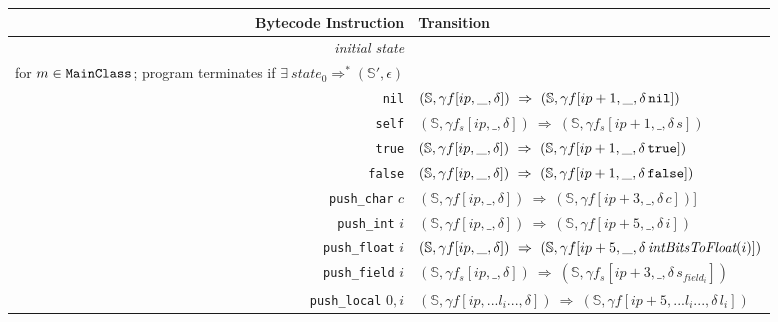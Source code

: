 \documentclass[11pt]{article}
\begin{document}
\begin{figure}
\begin{center}
\begin{tabular}[t]{|r|l|}
\hline
{\bf Bytecode Instruction} & {\bf Transition} \\
\hline
{\em initial state} &
\begin{minipage}[t]{.7\linewidth}
$state_0 = (\mathbb{S}[\text{\tt nil}, \text{\tt true}, \text{\tt false}, \text{\tt Transcript}], \text{\tt main}_{m}[0,\epsilon,\epsilon])$\\
for $m \in \text{\tt MainClass}$; program terminates if $\exists~ state_0 \Rightarrow^* (\mathbb{S'}, \epsilon)$ 
\end{minipage}\\
\hline
{\tt nil}  & $(\mathbb{S}, \gamma f[ip,\_,\delta]) ~\Rightarrow~ (\mathbb{S}, \gamma f[ip+1,\_,\delta\, \text{\tt nil}])$\\

{\tt self} & $(\mathbb{S},\gamma f_s[ip,\_,\delta]) ~\Rightarrow~ (\mathbb{S},\gamma f_s[ip+1,\_,\delta \,s])$ \\

{\tt true} & $(\mathbb{S},\gamma f[ip,\_,\delta]) ~\Rightarrow~ (\mathbb{S},\gamma f[ip+1,\_,\delta \,\text{\tt true}])$\\

{\tt false} & $(\mathbb{S},\gamma f[ip,\_,\delta]) ~\Rightarrow~ (\mathbb{S},\gamma f[ip+1,\_,\delta \,\text{\tt false}])$\\

{\tt push\_char} $c$ & $(\mathbb{S},\gamma f[ip,\_,\delta]) ~\Rightarrow~ (\mathbb{S},\gamma f[ip+3,\_,\delta \,c])$]\\

{\tt push\_int} $i$ & $(\mathbb{S},\gamma f[ip,\_,\delta]) ~\Rightarrow~ (\mathbb{S},\gamma f[ip+5,\_,\delta \,i])$\\

{\tt push\_float} $i$ & $(\mathbb{S},\gamma f[ip,\_,\delta]) ~\Rightarrow~ (\mathbb{S},\gamma f[ip+5,\_,\delta \, \text{\em intBitsToFloat}(i)])$\\

{\tt push\_field} $i$ & $(\mathbb{S},\gamma f_s[ip,\_,\delta]) ~\Rightarrow~ (\mathbb{S}, \gamma f_s[ip+3,\_,\delta \,s_{field_i}])$ \\

{\tt push\_local} $0, i$ & $(\mathbb{S},\gamma f[ip,... l_i ...,\delta]) ~\Rightarrow~ (\mathbb{S},\gamma f[ip+5,...l_i...,\delta \,l_i])$\\


\end{tabular}
\end{center}
\end{figure}
\end{document}
